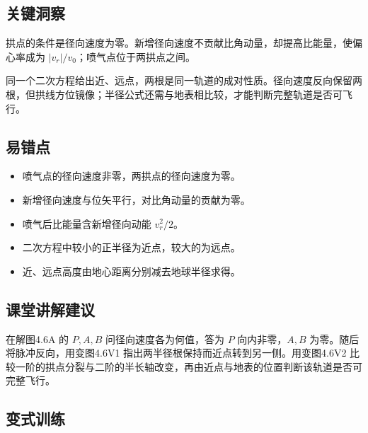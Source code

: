 \documentclass[UTF8,fontset=fandol,a4paper,11pt]{ctexart}
\begin{document}

\subsection*{关键洞察}

拱点的条件是径向速度为零。新增径向速度不贡献比角动量，却提高比能量，使偏心率成为
\(|v_r|/v_0\)；喷气点位于两拱点之间。

同一个二次方程给出近、远点，两根是同一轨道的成对性质。径向速度反向保留两根，但拱线方位镜像；半径公式还需与地表相比较，才能判断完整轨道是否可飞行。



\subsection*{易错点}

\begin{itemize}
\item 喷气点的径向速度非零，两拱点的径向速度为零。
\item 新增径向速度与位矢平行，对比角动量的贡献为零。
\item 喷气后比能量含新增径向动能 $v_r^2/2$。
\item 二次方程中较小的正半径为近点，较大的为远点。
\item 近、远点高度由地心距离分别减去地球半径求得。
\end{itemize}



\subsection*{课堂讲解建议}

在解图4.6A 的 $P,A,B$ 问径向速度各为何值，答为 $P$ 向内非零，$A,B$ 为零。随后将脉冲反向，用变图4.6V1 指出两半径根保持而近点转到另一侧。用变图4.6V2 比较一阶的拱点分裂与二阶的半长轴改变，再由近点与地表的位置判断该轨道是否可完整飞行。



\subsection*{变式训练}
\end{document}
